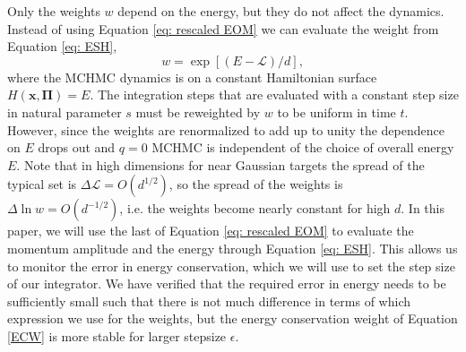 \documentclass[twoside,11pt]{article}
\newcommand{\p}{\boldsymbol{\Pi}}
\newcommand{\x}{\boldsymbol{x}}
\begin{document}
Only the weights $w$ depend on the energy, but they do not affect the 
dynamics. Instead of using 
Equation \ref{eq: rescaled EOM} we can evaluate the 
weight from Equation \ref{eq: ESH},
\begin{equation}
    w=\exp[(E-\mathcal{L})/d],
    \label{ECW}
\end{equation}
where the MCHMC dynamics is on a constant Hamiltonian surface $H(\x, \p)=E$. The integration steps 
that are evaluated with a constant step size in natural parameter $s$
must be reweighted by $w$ to be 
uniform in time $t$. However, 
since the weights are renormalized
to add up to unity the dependence on $E$ drops out and $q=0$ MCHMC is
independent of the choice of overall energy $E$. Note that in high dimensions 
for near Gaussian targets the spread of the typical set is 
$\Delta \mathcal{L} =O(d^{1/2})$, 
so the spread of the 
weights is $\Delta \ln w= O(d^{-1/2})$, i.e. the weights become nearly constant
for high $d$. In this paper, we will 
use the last of Equation \ref{eq: rescaled EOM} to 
evaluate the momentum amplitude and the 
energy through Equation \ref{eq: ESH}. 
This allows us to monitor the error in 
energy conservation, which we will use 
to set the step size of our 
integrator. We have verified that the 
required error in energy needs to 
be sufficiently small such that 
there is not much difference in terms 
of which expression we use for the 
weights, but the energy conservation 
weight of Equation \ref{ECW} is more stable
for larger stepsize $\epsilon$. 
\end{document}
